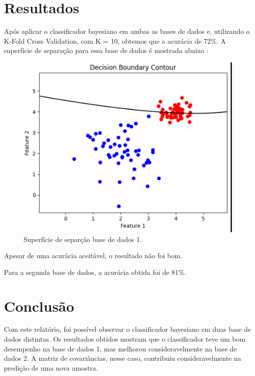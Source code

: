 \documentclass{article}
\begin{document}
\section{Resultados}

Após aplicar o classificador bayesiano em ambas as bases de dados e, utilizando o K-Fold Cross Validation, com K = 10, obtemos que a acurácia de 72\%. A superfície de separação para essa base de dados é mostrada abaixo :


\begin{figure}[h]
    \centering
    \includegraphics[width=0.75\linewidth]{surface_plot.png}
    \caption{Superfície de separção base de dados 1.}
    \label{fig:kernel_types}
 \end{figure}

Apesar de uma acurácia aceitável, o resultado não foi bom.

\vspace{1cm}

Para a segunda base de dados, a acurácia obtida foi de 81\%.
\section{Conclusão}

Com este relatório, foi possível observar o classificador bayesiano em duas base de dados distintas. Os resultados obtidos mostram que o classificador teve um bom desempenho na base de dados 1, mas melhorou consideravelmente na base de dados 2. A matriz de covariâncias, nesse caso, contribuiu consideravelmente na predição de uma nova amostra.
\end{document}
